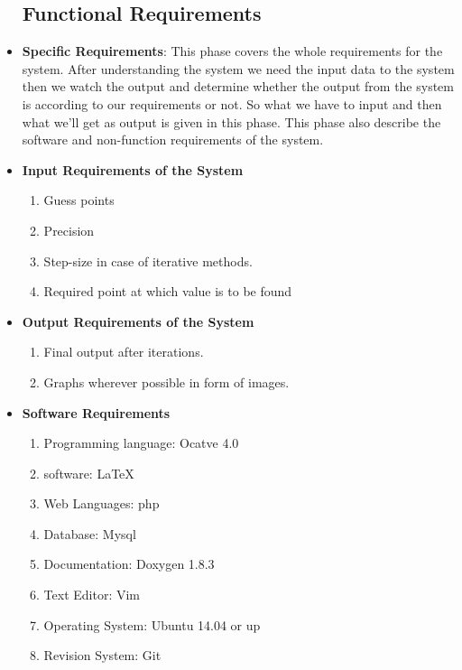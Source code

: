 \begin{itemize}
\subsection{Functional Requirements}
\item {\bf Specific Requirements}: This phase covers the whole requirements 
for the system. After understanding the system we need the input data 
to the system then we watch the output and determine whether the output 
from the system is according to our requirements or not. So what we have 
to input and then what we’ll get as output is given in this phase. This 
phase also describe the software and non-function requirements of the 
system.
\item {\bf Input Requirements of the System}
\begin{enumerate} 
\item Guess points
\item Precision
\item Step-size in case of iterative methods.
\item Required point at which value is to be found
\end{enumerate}
\vskip 0.5cm
\item {\bf Output Requirements of the System}
\begin{enumerate} 
\item Final output after iterations.
\item Graphs wherever possible in form of images. 
\end{enumerate}
\vskip 0.5cm
\item {\bf Software Requirements}
\begin{enumerate} 
\item Programming language: Ocatve 4.0
\item software: \LaTeX{}
\item Web Languages: php
\item Database: Mysql 
\item Documentation: Doxygen 1.8.3
\item Text Editor: Vim
\item Operating System: Ubuntu 14.04 or up
\item Revision System: Git
\end{enumerate}
\end{itemize}


